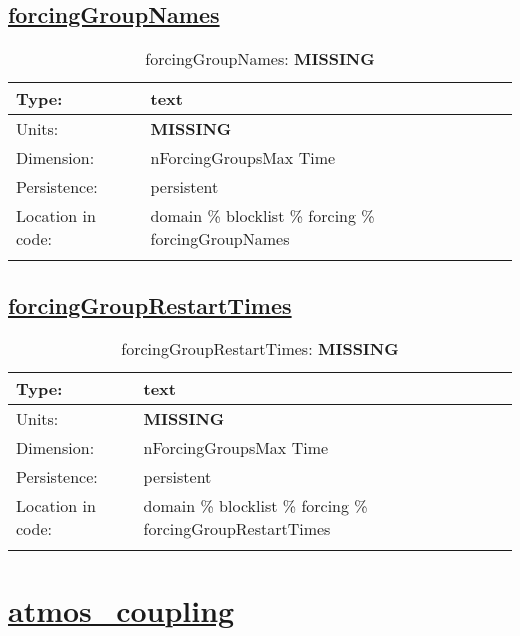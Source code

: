 \subsection[forcingGroupNames]{\hyperref[sec:var_tab_forcing]{forcingGroupNames}}
\label{subsec:var_sec_forcing_forcingGroupNames}
\begin{center}
\begin{longtable}{| p{2.0in} | p{4.0in} |}
        \hline 
        Type: & text \\
        \hline 
        Units: & {\bf \color{red} MISSING} \\
        \hline 
        Dimension: & nForcingGroupsMax Time \\
        \hline 
        Persistence: & persistent \\
        \hline 
         Location in code: & domain \% blocklist \% forcing \% forcingGroupNames \\
         \hline 
    \caption{forcingGroupNames: {\bf \color{red} MISSING}}
\end{longtable}
\end{center}
\subsection[forcingGroupRestartTimes]{\hyperref[sec:var_tab_forcing]{forcingGroupRestartTimes}}
\label{subsec:var_sec_forcing_forcingGroupRestartTimes}
\begin{center}
\begin{longtable}{| p{2.0in} | p{4.0in} |}
        \hline 
        Type: & text \\
        \hline 
        Units: & {\bf \color{red} MISSING} \\
        \hline 
        Dimension: & nForcingGroupsMax Time \\
        \hline 
        Persistence: & persistent \\
        \hline 
         Location in code: & domain \% blocklist \% forcing \% forcingGroupRestartTimes \\
         \hline 
    \caption{forcingGroupRestartTimes: {\bf \color{red} MISSING}}
\end{longtable}
\end{center}
\section[atmos\_coupling]{\hyperref[sec:var_tab_atmos_coupling]{atmos\_coupling}}
\label{sec:var_sec_atmos_coupling}
